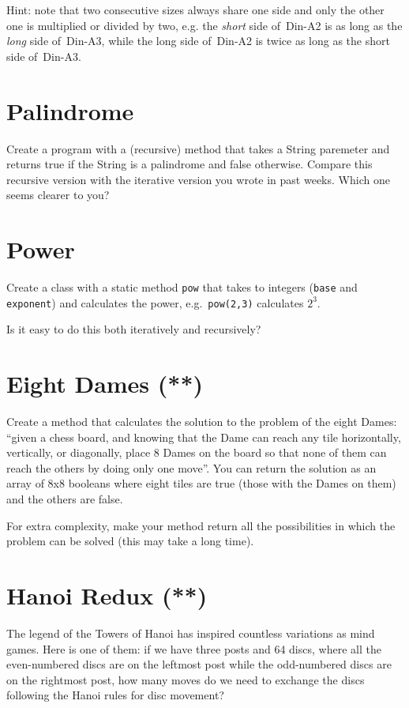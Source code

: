\documentclass{article}
\begin{document}
Hint: note that two consecutive sizes always share one side and only
the other one is multiplied or divided by two, e.g. the \emph{short}
side of~Din-A2 is as long as the \emph{long} side of~Din-A3, while the
long side of~Din-A2 is twice as long as the short side of~Din-A3.

\section{Palindrome}
\label{sec:palindrome}

Create a program with a (recursive) method that takes a String
paremeter and
returns true if the String is a palindrome and false
otherwise. Compare this recursive version with the iterative version
you wrote in past weeks. Which one seems clearer to you?

\section{Power}
\label{sec:power}

Create a class with a static method \verb+pow+ that takes to integers
(\verb+base+ and \verb+exponent+) and calculates the power, 
e.g.~\verb+pow(2,3)+ calculates $2^3$. 

Is it easy to do this both iteratively and recursively? 


\section{Eight Dames (**)}
\label{sec:eight-dames}

Create a method that calculates the solution to the problem of the
eight Dames: ``given a chess board, and knowing that the Dame can reach
any tile horizontally, vertically, or diagonally, place 8 Dames on the
board so that none of them can reach the others by doing only one
move''. You can return the solution as an array of 8x8 booleans where
eight tiles are true (those with the Dames on them) and the others are false. 

For extra complexity, make your method return all the possibilities in
which the problem can be solved (this may take a long time). 

\section{Hanoi Redux (**)}
\label{sec:hanoi-redux}

The legend of the Towers of Hanoi has inspired countless variations as
mind games. Here is one of them: if we have three posts and 64 discs,
where all the even-numbered discs are on the leftmost post while the
odd-numbered discs are on the rightmost post, how many moves do we
need to exchange the discs following the Hanoi rules for disc
movement? 
\end{document}
